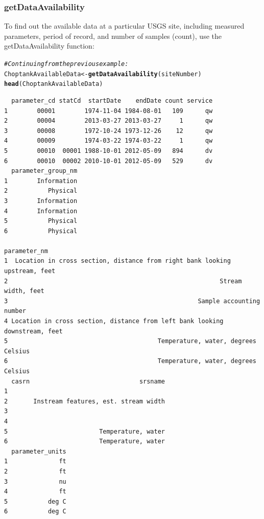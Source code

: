 \documentclass[a4paper,11pt]{article}\usepackage[]{graphicx}\usepackage[]{color}
\makeatletter
\newcommand{\hlcom}[1]{\textcolor[rgb]{0.678,0.584,0.686}{\textit{#1}}}%
\newcommand{\hlstd}[1]{\textcolor[rgb]{0.345,0.345,0.345}{#1}}%
\newcommand{\hlkwb}[1]{\textcolor[rgb]{0.69,0.353,0.396}{#1}}%
\newcommand{\hlkwd}[1]{\textcolor[rgb]{0.737,0.353,0.396}{\textbf{#1}}}%
\newenvironment{kframe}{%
 \def\at@end@of@kframe{}%
 \ifinner\ifhmode%
  \def\at@end@of@kframe{\end{minipage}}%
  \begin{minipage}{\columnwidth}%
 \fi\fi%
 \def\FrameCommand##1{\hskip\@totalleftmargin \hskip-\fboxsep
 \colorbox{shadecolor}{##1}\hskip-\fboxsep
     \hskip-\linewidth \hskip-\@totalleftmargin \hskip\columnwidth}%
 \MakeFramed {\advance\hsize-\width
   \@totalleftmargin\z@ \linewidth\hsize
   \@setminipage}}%
 {\par\unskip\endMakeFramed%
 \at@end@of@kframe}
\newenvironment{knitrout}{}{} %
\makeatother
\begin{document}
\subsubsection{getDataAvailability}
\label{sec:usgsDataAvailability}
To find out the available data at a particular USGS site, including measured parameters, period of record, and number of samples (count), use the getDataAvailability function:

\begin{knitrout}
\color{fgcolor}\begin{kframe}
\begin{alltt}
\hlcom{# Continuing from the previous example:}
\hlstd{ChoptankAvailableData} \hlkwb{<-} \hlkwd{getDataAvailability}\hlstd{(siteNumber)}
\hlkwd{head}\hlstd{(ChoptankAvailableData)}
\end{alltt}
\begin{verbatim}
  parameter_cd statCd  startDate    endDate count service
1        00001        1974-11-04 1984-08-01   109      qw
2        00004        2013-03-27 2013-03-27     1      qw
3        00008        1972-10-24 1973-12-26    12      qw
4        00009        1974-03-22 1974-03-22     1      qw
5        00010  00001 1988-10-01 2012-05-09   894      dv
6        00010  00002 2010-10-01 2012-05-09   529      dv
  parameter_group_nm
1        Information
2           Physical
3        Information
4        Information
5           Physical
6           Physical
                                                                 parameter_nm
1  Location in cross section, distance from right bank looking upstream, feet
2                                                          Stream width, feet
3                                                    Sample accounting number
4 Location in cross section, distance from left bank looking downstream, feet
5                                         Temperature, water, degrees Celsius
6                                         Temperature, water, degrees Celsius
  casrn                              srsname
1                                           
2       Instream features, est. stream width
3                                           
4                                           
5                         Temperature, water
6                         Temperature, water
  parameter_units
1              ft
2              ft
3              nu
4              ft
5           deg C
6           deg C
\end{verbatim}
\end{kframe}
\end{knitrout}
\end{document}
